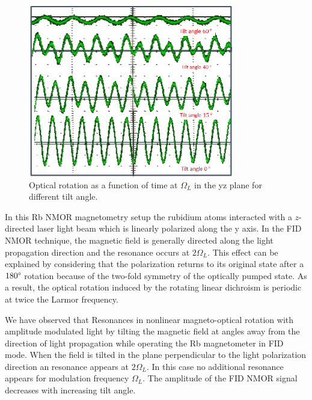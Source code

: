 \begin{figure}
  \centering
\includegraphics[width=0.8\textwidth]{figures/tilted_field_scope_trace.png}
  \caption{Optical rotation as a function of time at $\Omega_L$ in the yz plane for different tilt angle.   \label{fig:optical-rotation-different-angle}}
    
\end{figure}
In this Rb NMOR magnetometry setup the rubidium atoms interacted with a $z$-directed laser light beam which is linearly polarized
along the y axis. In the FID NMOR technique, the magnetic field is generally directed along the light propagation direction and the resonance occurs at $2\Omega_L$.  This effect can be explained by considering that the polarization returns to its original state after a $180\degree$ rotation because of the two-fold symmetry of the optically pumped state. As a result, the optical rotation induced by the rotating linear dichroism is periodic at twice the Larmor frequency.

We have observed that Resonances in nonlinear magneto-optical rotation with amplitude modulated light by tilting the magnetic field at angles away from the direction of light propagation while operating the Rb magnetometer in FID mode. When the field is tilted in the plane perpendicular to the light polarization direction an resonance appears at $2\Omega_L$. In this case no additional resonance appears for modulation frequency $\Omega_L$. The amplitude of the FID NMOR signal decreases with increasing tilt angle. 

